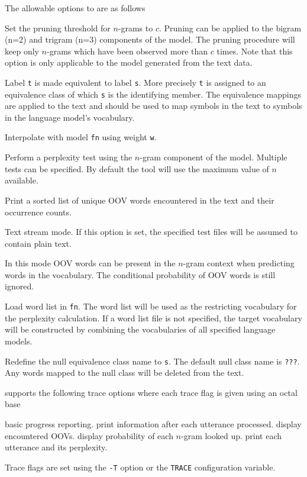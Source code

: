 The allowable options to  are as follows
\begin{optlist}

   Set the pruning threshold for $n$-grams to $c$.  Pruning can
	be applied to the bigram (n=2) and trigram (n=3) components of the
	model. The pruning procedure will keep only $n$-grams which have been
	observed more than $c$ times. Note that this option is only applicable
	to the model generated from the text data.

   Label {\tt t} is made equivalent to label {\tt s}. More 
	precisely {\tt t} is assigned to an equivalence class of which {\tt s}
	is the identifying member. The equivalence mappings are applied to the
	text and should be used to map symbols in the text to symbols in the
	language model's vocabulary.

   Interpolate with model {\tt fn} using weight {\tt w}.

   Perform a perplexity test using the $n$-gram component of the
	model. Multiple tests can be specified. By default the tool will use
	the maximum value of $n$ available.

   Print a sorted list of unique OOV words encountered in the text
	and their occurrence counts.

   Text stream mode. If this option is set, the specified test files 
	will be assumed to contain plain text. 

   In this mode OOV words can be present in the $n$-gram context
	when predicting words in the vocabulary. The conditional probability of
	OOV words is still ignored.

   Load word list in {\tt fn}. The word list will be used as the
	restricting vocabulary for the perplexity calculation. If a word list
	file is not specified, the target vocabulary will be constructed by
	combining the vocabularies of all specified language models.

   Redefine the null equivalence class name to {\tt s}. The default 
	null class name is {\tt ???}. Any words mapped to the null class will be
	deleted from the text.
\end{optlist}


 supports the following trace options where each trace flag is 
given using an octal base
\begin{optlist}
   basic progress reporting. 
   print information after each utterance processed.
   display encountered OOVs.
   display probability of each $n$-gram looked up.
   print each utterance and its perplexity.
\end{optlist}
Trace flags are set using the \texttt{-T} option or the \texttt{TRACE}
configuration variable.
